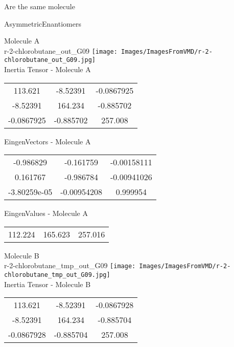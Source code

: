 \begin{center}
\vtab
\vtab
\textcolor{NavyBlue}{\Large Are the same molecule}
\end{center}
\newpage

\vtab[-2cm]
\begin{center}
{\large AsymmetricEnantiomers}
\end{center}
\begin{multicols}{2}
\begin{center}
Molecule A \\ 
r-2-chlorobutane\_out\_G09
\texttt{[image: Images/ImagesFromVMD/r-2-chlorobutane\_out\_G09.jpg]}
\\
Inertia Tensor - Molecule A \\
\vtab
\begin{tabular}{|c c c|}
113.621	 & 	-8.52391	 & 	-0.0867925	 \\
-8.52391	 & 	164.234	 & 	-0.885702	 \\
-0.0867925	 & 	-0.885702	 & 	257.008
\end{tabular}

\vtab
 EingenVectors - Molecule A     \\
\vtab
\begin{tabular}{|c c c|}
-0.986829	 & 	-0.161759	 & 	-0.00158111	 \\
0.161767	 & 	-0.986784	 & 	-0.00941026	 \\
-3.80259e-05	 & 	-0.00954208	 & 	0.999954
\end{tabular}

\vtab
 EingenValues - Molecule A     \\
\vtab
\begin{tabular}{|c c c|}
112.224	 & 	165.623	 & 	257.016
\end{tabular}
\columnbreak

Molecule B \\ 
r-2-chlorobutane\_tmp\_out\_G09
\texttt{[image: Images/ImagesFromVMD/r-2-chlorobutane\_tmp\_out\_G09.jpg]}
\\
Inertia Tensor - Molecule B \\
\vtab
\begin{tabular}{|c c c|}
113.621	 & 	-8.52391	 & 	-0.0867928	 \\
-8.52391	 & 	164.234	 & 	-0.885704	 \\
-0.0867928	 & 	-0.885704	 & 	257.008
\end{tabular}


\end{center}
\end{multicols}
